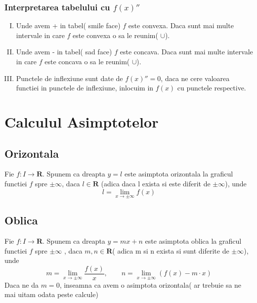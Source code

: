 \documentclass[11pt]{article}
\begin{document}
    \subsubsection*{Interpretarea tabelului cu $f(x)''$}
    \begin{enumerate}[I.]
        \item   Unde avem + in tabel( smile face) $f$ este convexa. Daca sunt mai multe intervale in care
                $f$ este convexa o sa le reunim( $\cup$).
        \item   Unde avem - in tabel( sad face) $f$ este concava. Daca sunt mai multe intervale in care $f$
                este concava o sa le reunim( $\cup$).
        \item   Punctele de inflexiune sunt date de $f(x)'' = 0$, daca ne cere valoarea functiei in punctele
                de inflexiune, inlocuim in $f(x)$ cu punctele respective.
    \end{enumerate}
    
\section*{Calculul Asimptotelor}
    \subsection*{Orizontala}
        \begin{flushleft}
        \qquad Fie $f:I \to \mathbf{R}$. Spunem ca dreapta $y = l$ este asimptota orizontala la graficul 
        functiei $f$ spre
        $ \pm \infty$, daca $l \in \mathbf{R}$ (adica daca l exista si este diferit de $\pm \infty$), unde
        \[ l = \lim_{x \to \pm \infty} f(x)\]
        \end{flushleft}
    \subsection*{Oblica}
        \begin{flushleft}
            \qquad Fie $f:I \to \mathbf{R}$. Spunem ca dreapta $y = mx + n$ este asimptota oblica la 
            graficul functiei 
            $f$ spre $\pm \infty$ , daca $m,n \in \mathbf{R}$( adica m si n exista si sunt diferite de $\pm 
            \infty$), unde
            \[ m = \lim_{x \to \pm \infty} \frac{f(x)}{x}, \qquad n = \lim_{x \to \pm \infty} (f(x) - m 
            \cdot x)\]
            \qquad Daca ne da $m = 0$, inseamna ca avem o asimptota orizontala( ar trebuie sa ne mai uitam
            odata peste calcule)
        \end{flushleft}
        
\end{document}
